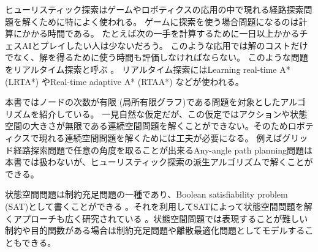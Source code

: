ヒューリスティック探索はゲームやロボティクスの応用の中で現れる経路探索問題を解くために特によく使われる。
ゲームに探索を使う場合問題になるのは計算にかかる時間である。
たとえば次の一手を計算するために一日以上かかるチェスAIとプレイしたい人は少ないだろう。
このような応用では解のコストだけでなく、解を得るために使う時間も評価しなければならない。
このような問題をリアルタイム探索と呼ぶ \cite{korf90,barto1995learning}。
リアルタイム探索にはLearning real-time A* (LRTA*) \cite{korf90,koenig2001minimax}やReal-time adaptive A* (RTAA*) \cite{koenig2006real}などが使われる。

本書ではノードの次数が有限 (局所有限グラフ)である問題を対象としたアルゴリズムを紹介している。
一見自然な仮定だが、この仮定ではアクションや状態空間の大きさが無限である連続空間問題を解くことができない。そのためロボティクスで現れる連続空間問題を解くためには工夫が必要になる。
例えばグリッド経路探索問題で任意の角度を取ることが出来るAny-angle path planning問題は本書では扱わないが、ヒューリスティック探索の派生アルゴリズムで解くことができる\cite{lavalle2006planning,lavalle2001rapidly,daniel2010theta,nash2013any}。

状態空間問題は制約充足問題の一種であり、Boolean satisfiability problem (SAT)として書くことができる \cite{garey1979computers}。それを利用してSATによって状態空間問題を解くアプローチも広く研究されている \cite{kautz1992planning,kautz2006satplan,rintanen2012planning}。状態空間問題では表現することが難しい制約や目的関数がある場合は制約充足問題や離散最適化問題としてモデルすることもできる。
